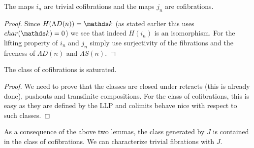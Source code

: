 
\begin{lemma}
	The maps $i_n$ are trivial cofibrations and the maps $j_n$ are cofibrations.
\end{lemma}
\begin{proof}
	Since $H(\Lambda D(n)) = \k$ (as stated earlier this uses $\Char{\k} = 0$) we see that indeed $H(i_n)$ is an isomorphism. For the lifting property of $i_n$ and $j_n$ simply use surjectivity of the fibrations and the freeness of $\Lambda D(n)$ and $\Lambda S(n)$.
\end{proof}

\begin{lemma}
	The class of cofibrations is saturated.
\end{lemma}
\begin{proof}
	We need to prove that the classes are closed under retracts (this is already done), pushouts and transfinite compositions. For the class of cofibrations, this is easy as they are defined by the LLP and colimits behave nice with respect to such classes. 
\end{proof}

As a consequence of the above two lemmas, the class generated by $J$ is contained in the class of cofibrations. We can characterize trivial fibrations with $J$.

